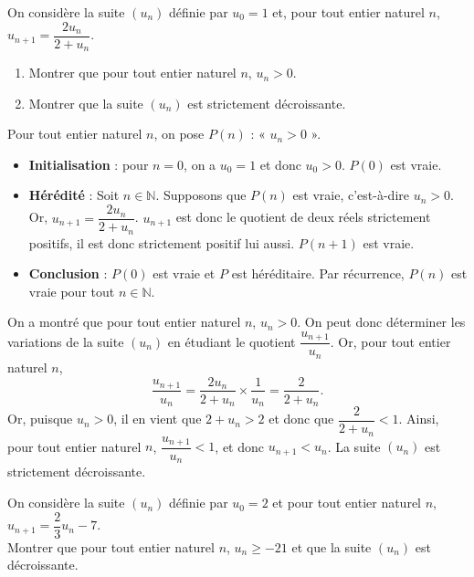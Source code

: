 \documentclass[11pt,fleqn]{book} %
\begin{document}
\begin{exercise}
On considère la suite \((u_n)\) définie par \(u_0=1\) et, pour tout entier naturel \(n\), \(u_{n+1}=\dfrac{2u_n}{2+u_n}\).
\begin{enumerate}
\item Montrer que pour tout entier naturel \(n\), \(u_n > 0\).
\item Montrer que la suite \((u_n)\) est strictement décroissante.
\end{enumerate}\end{exercise}

\begin{solution}Pour tout entier naturel \(n\), on pose \(P(n)\) : « \(u_n > 0\) ».

\begin{itemize}\item \textbf{Initialisation} : pour \(n=0\), on a \(u_0=1\) et donc \(u_0 > 0\). \(P(0)\) est vraie.
\item \textbf{Hérédité} : Soit \(n\in\mathbb{N}\). Supposons que \(P(n)\) est vraie, c'est-à-dire \(u_n > 0\). Or, \(u_{n+1}=\dfrac{2u_n}{2+u_n}\). \(u_{n+1}\) est donc le quotient de deux réels strictement positifs, il est donc strictement positif lui aussi. \(P(n+1)\) est vraie.
\item \textbf{Conclusion} : \(P(0)\) est vraie et \(P\) est héréditaire. Par récurrence, \(P(n)\) est vraie pour tout \(n\in\mathbb{N}\).
\end{itemize}
 On a montré que pour tout entier naturel \(n\), \(u_n > 0\). On peut donc déterminer les variations de la suite \((u_n)\) en étudiant le quotient \(\dfrac{u_{n+1}}{u_n}\). Or, pour tout entier naturel \(n\), 
\[\dfrac{u_{n+1}}{u_n} = \dfrac{2u_n}{2+u_n} \times \dfrac{1}{u_n} = \dfrac{2}{2+u_n}.\]
Or, puisque \(u_n > 0\), il en vient que \( 2+u_n > 2\) et donc que \( \dfrac{2}{2+u_n} < 1\). Ainsi, pour tout entier naturel \(n\), \(\dfrac{u_{n+1}}{u_n} < 1\), et donc \(u_{n+1} < u_n\). La suite \((u_n)\) est strictement décroissante.\end{solution}

\begin{exercise}
On considère la suite $(u_n)$ définie par $u_0=2$ et pour tout entier naturel $n$, $u_{n+1}=\dfrac{2}{3}u_n-7$. \\Montrer que pour tout entier naturel $n$, $u_n\geqslant -21$ et que la suite $(u_n)$ est décroissante.\end{exercise}
\end{document}
